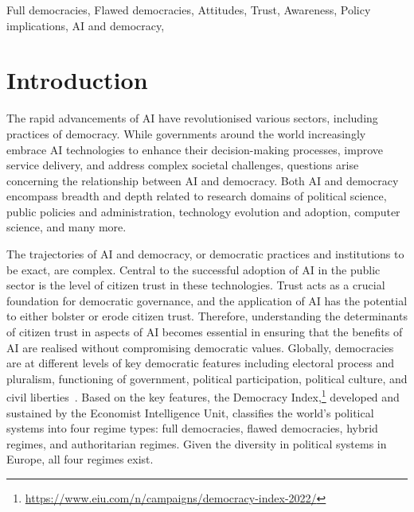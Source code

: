 \documentclass[
]{ceurart}
\begin{document}
\begin{keywords}
  Full democracies,
  Flawed democracies,
  Attitudes,
  Trust,
  Awareness, 
  Policy implications, 
  AI and democracy, 
\end{keywords}

\maketitle

\section{Introduction}
The rapid advancements of AI have revolutionised various sectors, including practices of democracy. While governments around the world increasingly embrace AI technologies to enhance their decision-making processes, improve service delivery, and address complex societal challenges, questions arise concerning the relationship between AI and democracy. Both AI and democracy encompass breadth and depth related to research domains of political science, public policies and administration, technology evolution and adoption, computer science, and many more.

The trajectories of AI and democracy, or democratic practices and institutions to be exact, are complex. Central to the successful adoption of AI in the public sector is the level of citizen trust in these technologies. Trust acts as a crucial foundation for democratic governance, and the application of AI has the potential to either bolster or erode citizen trust. Therefore, understanding the determinants of citizen trust in aspects of AI becomes essential in ensuring that the benefits of AI are realised without compromising democratic values. Globally, democracies are at different levels of key democratic features including electoral process and pluralism, functioning of government, political participation, political culture, and civil liberties~\cite{unit2022democracy}. Based on the key features, the Democracy Index,\footnote{\url{https://www.eiu.com/n/campaigns/democracy-index-2022/}} developed and sustained by the Economist Intelligence Unit, classifies the world's political systems into four regime types: full democracies, flawed democracies, hybrid regimes, and authoritarian regimes. Given the diversity in political systems in Europe, all four regimes exist. 
\end{document}
